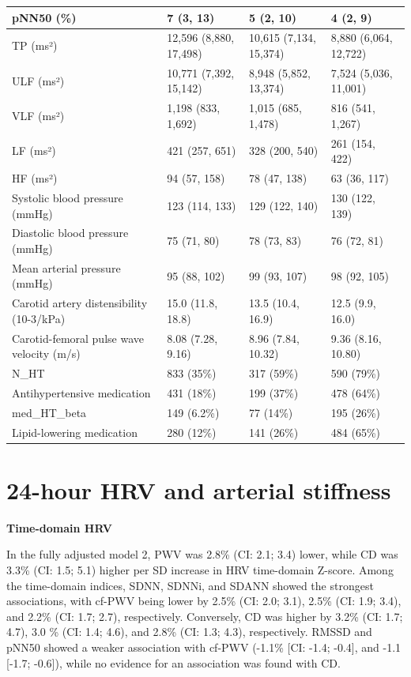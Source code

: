 \documentclass[
  a4paper,
  headsepline=true,
  open=any]{scrbook}
\begin{document}
\begin{table}
\begin{tabular}{l|l|l|l}
\hline
pNN50 (\%) & 7 (3, 13) & 5 (2, 10) & 4 (2, 9)\\
\hline
TP (ms²) & 12,596 (8,880, 17,498) & 10,615 (7,134, 15,374) & 8,880 (6,064, 12,722)\\
\hline
ULF (ms²) & 10,771 (7,392, 15,142) & 8,948 (5,852, 13,374) & 7,524 (5,036, 11,001)\\
\hline
VLF (ms²) & 1,198 (833, 1,692) & 1,015 (685, 1,478) & 816 (541, 1,267)\\
\hline
LF (ms²) & 421 (257, 651) & 328 (200, 540) & 261 (154, 422)\\
\hline
HF (ms²) & 94 (57, 158) & 78 (47, 138) & 63 (36, 117)\\
\hline
Systolic blood pressure (mmHg) & 123 (114, 133) & 129 (122, 140) & 130 (122, 139)\\
\hline
Diastolic blood pressure (mmHg) & 75 (71, 80) & 78 (73, 83) & 76 (72, 81)\\
\hline
Mean arterial pressure (mmHg) & 95 (88, 102) & 99 (93, 107) & 98 (92, 105)\\
\hline
Carotid artery distensibility (10-3/kPa) & 15.0 (11.8, 18.8) & 13.5 (10.4, 16.9) & 12.5 (9.9, 16.0)\\
\hline
Carotid-femoral pulse wave velocity (m/s) & 8.08 (7.28, 9.16) & 8.96 (7.84, 10.32) & 9.36 (8.16, 10.80)\\
\hline
N\_HT & 833 (35\%) & 317 (59\%) & 590 (79\%)\\
\hline
Antihypertensive medication & 431 (18\%) & 199 (37\%) & 478 (64\%)\\
\hline
med\_HT\_beta & 149 (6.2\%) & 77 (14\%) & 195 (26\%)\\
\hline
Lipid-lowering medication & 280 (12\%) & 141 (26\%) & 484 (65\%)\\
\hline
\end{tabular}
\end{table}

\hypertarget{hour-hrv-and-arterial-stiffness}{%
\section{24-hour HRV and arterial
stiffness}\label{hour-hrv-and-arterial-stiffness}}

\textbf{Time-domain HRV}

In the fully adjusted model 2, PWV was 2.8\% (CI: 2.1; 3.4) lower, while
CD was 3.3\% (CI: 1.5; 5.1) higher per SD increase in HRV time-domain
Z-score. Among the time-domain indices, SDNN, SDNNi, and SDANN showed
the strongest associations, with cf-PWV being lower by 2.5\% (CI: 2.0;
3.1), 2.5\% (CI: 1.9; 3.4), and 2.2\% (CI: 1.7; 2.7), respectively.
Conversely, CD was higher by 3.2\% (CI: 1.7; 4.7), 3.0 \% (CI: 1.4;
4.6), and 2.8\% (CI: 1.3; 4.3), respectively. RMSSD and pNN50 showed a
weaker association with cf-PWV (-1.1\% {[}CI: -1.4; -0.4{]}, and -1.1
{[}-1.7; -0.6{]}), while no evidence for an association was found with
CD.
\end{document}
